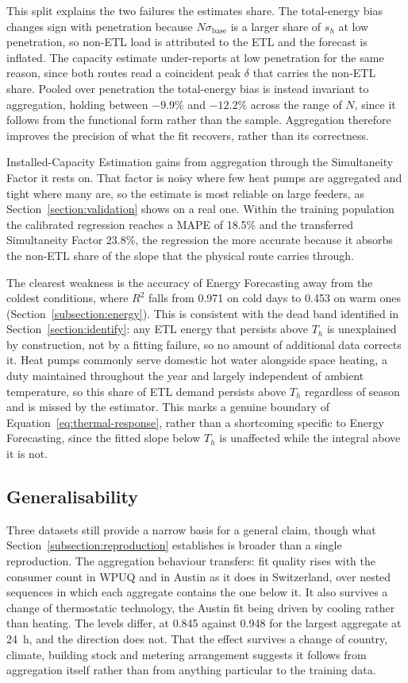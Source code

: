 \documentclass[9pt,journal,a4]{IEEEtran}
\begin{document}
This split explains the two failures the estimates share. The total-energy bias changes sign with penetration because $N \sigma_{\mathrm{base}}$ is a larger share of $s_h$ at low penetration, so non-ETL load is attributed to the ETL and the forecast is inflated. The capacity estimate under-reports at low penetration for the same reason, since both routes read a coincident peak $\delta$ that carries the non-ETL share. Pooled over penetration the total-energy bias is instead invariant to aggregation, holding between $-9.9\%$ and $-12.2\%$ across the range of $N$, since it follows from the functional form rather than the sample. Aggregation therefore improves the precision of what the fit recovers, rather than its correctness.

Installed-Capacity Estimation gains from aggregation through the Simultaneity Factor it rests on. That factor is noisy where few heat pumps are aggregated and tight where many are, so the estimate is most reliable on large feeders, as Section~\ref{section:validation} shows on a real one. Within the training population the calibrated regression reaches a MAPE of 18.5\% and the transferred Simultaneity Factor 23.8\%, the regression the more accurate because it absorbs the non-ETL share of the slope that the physical route carries through.

The clearest weakness is the accuracy of Energy Forecasting away from the coldest conditions, where $R^2$ falls from 0.971 on cold days to 0.453 on warm ones (Section~\ref{subsection:energy}). This is consistent with the dead band identified in Section~\ref{section:identify}: any ETL energy that persists above $T_h$ is unexplained by construction, not by a fitting failure, so no amount of additional data corrects it. Heat pumps commonly serve domestic hot water alongside space heating, a duty maintained throughout the year and largely independent of ambient temperature, so this share of ETL demand persists above $T_h$ regardless of season and is missed by the estimator. This marks a genuine boundary of Equation~\eqref{eq:thermal-response}, rather than a shortcoming specific to Energy Forecasting, since the fitted slope below $T_h$ is unaffected while the integral above it is not.


\subsection{Generalisability}
\label{subsection:generalisability}

Three datasets still provide a narrow basis for a general claim, though what Section~\ref{subsection:reproduction} establishes is broader than a single reproduction. The aggregation behaviour transfers: fit quality rises with the consumer count in WPUQ and in Austin as it does in Switzerland, over nested sequences in which each aggregate contains the one below it. It also survives a change of thermostatic technology, the Austin fit being driven by cooling rather than heating. The levels differ, at 0.845 against 0.948 for the largest aggregate at 24~h, and the direction does not. That the effect survives a change of country, climate, building stock and metering arrangement suggests it follows from aggregation itself rather than from anything particular to the training data.
\end{document}
